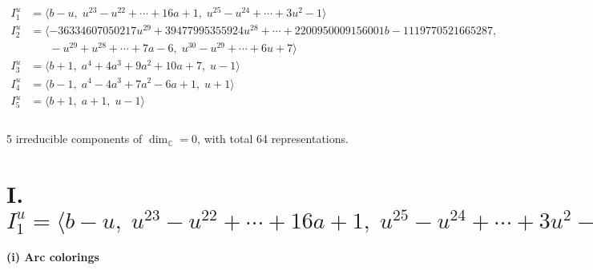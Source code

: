 \documentclass[1p]{elsarticle_modified}
\theoremstyle{definition}
\begin{document}
\begin{align*}
I^u_{1}&=\langle 
b- u,\;u^{23}- u^{22}+\cdots+16 a+1,\;u^{25}- u^{24}+\cdots+3 u^2-1\rangle \\
I^u_{2}&=\langle 
-36334607050217 u^{29}+39477995355924 u^{28}+\cdots+2200950009156001 b-1119770521665287,\\
\phantom{I^u_{2}}&\phantom{= \langle  }- u^{29}+u^{28}+\cdots+7 a-6,\;u^{30}- u^{29}+\cdots+6 u+7\rangle \\
I^u_{3}&=\langle 
b+1,\;a^4+4 a^3+9 a^2+10 a+7,\;u-1\rangle \\
I^u_{4}&=\langle 
b-1,\;a^4-4 a^3+7 a^2-6 a+1,\;u+1\rangle \\
I^u_{5}&=\langle 
b+1,\;a+1,\;u-1\rangle \\
\\
\end{align*}
\raggedright * 5 irreducible components of $\dim_{\mathbb{C}}=0$, with total 64 representations.\\
\newpage
\renewcommand{\arraystretch}{1}
\centering \section*{I. $I^u_{1}= \langle b- u,\;u^{23}- u^{22}+\cdots+16 a+1,\;u^{25}- u^{24}+\cdots+3 u^2-1 \rangle$}
\flushleft \textbf{(i) Arc colorings}\\
\end{document}
